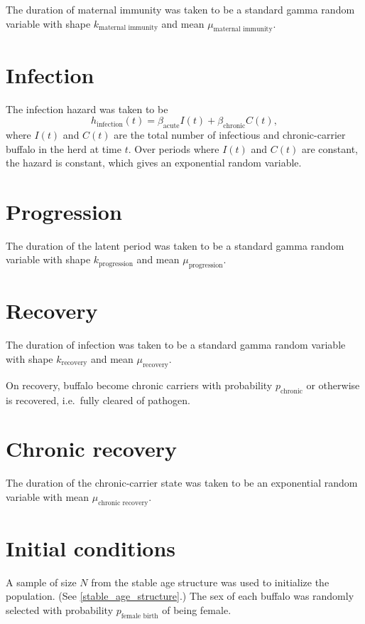\documentclass[12pt]{article}
\begin{document}
The duration of maternal immunity was taken to be a standard gamma
random variable with shape $k_{\text{maternal immunity}}$
and mean $\mu_{\text{maternal immunity}}$.


\section{Infection}

The infection hazard was taken to be
\begin{equation}
  h_{\text{infection}}(t) = \beta_{\text{acute}} I(t) +
  \beta_{\text{chronic}} C(t),
\end{equation}
where $I(t)$ and $C(t)$ are the total number of infectious and
chronic-carrier buffalo in the herd at time $t$.  Over periods where
$I(t)$ and $C(t)$ are constant, the hazard is constant, which gives an
exponential random variable.


\section{Progression}

The duration of the latent period was taken to be a standard gamma
random variable with shape $k_{\text{progression}}$
and mean $\mu_{\text{progression}}$.


\section{Recovery}

The duration of infection was taken to be a standard gamma random
variable with shape $k_{\text{recovery}}$ and mean
$\mu_{\text{recovery}}$.

On recovery, buffalo become chronic carriers with probability
$p_{\text{chronic}}$ or otherwise is recovered, i.e.~fully cleared
of pathogen.


\section{Chronic recovery}

The duration of the chronic-carrier state was taken to be an
exponential random variable with mean
$\mu_{\text{chronic recovery}}$.


\section{Initial conditions}

A sample of size $N$ from the stable age structure was used to
initialize the population.  (See \autoref{stable_age_structure}.)  The
sex of each buffalo was randomly selected with probability
$p_{\text{female birth}}$ of being female.
\end{document}

